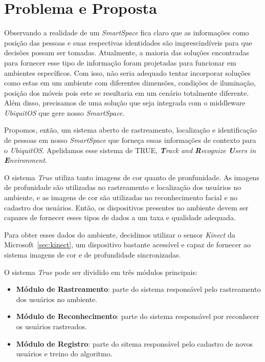 \chapter{Problema e Proposta}

Observando a realidade de um \textit{SmartSpace} fica claro que as informações como posição das pessoas e suas respectivas identidades são imprescindíveis para que decisões possam ser tomadas. Atualmente, a maioria das soluções encontradas para fornecer esse tipo de informação foram projetadas para funcionar em ambientes específicos. Com isso, não seria adequado tentar incorporar soluções como estas em um ambiente com diferentes dimensões, condições de iluminação, posição dos móveis pois este se resultaria em um cenário totalmente diferente. Além disso, precisamos de uma solução que seja integrada com o middleware \textit{UbiquitOS} que gere nosso \textit{SmartSpace}.

Propomos, então, um sistema aberto de rastreamento, localização e identificação de pessoas em nosso \textit{SmartSpace} que forneça essas informações de contexto para o \textit{UbiquitOS}. Apelidamos esse sistema de TRUE, \textit{\textbf{T}rack and \textbf{R}ecognize \textbf{U}sers in \textbf{E}nvironment}.

O sistema \textit{True} utiliza tanto imagens de cor quanto de pronfunidade. As imagens de profunidade são utilizadas no rastreamento e localização dos usuários no ambiente, e as imagens de cor são utilizadas no reconhecimento facial e no cadastro dos usuários. Então, os dispositivos presentes no ambiente devem ser capazes de fornecer esses tipos de dados a um taxa e qualidade adequada. 

Para obter esses dados do ambiente, decidimos utilizar o sensor \textit{Kinect} da Microsoft~\ref{sec:kinect}, um dispositivo bastante acessível e capaz de fornecer ao sistema imagens de cor e de profundidade sincronizadas.

O sistema \textit{True} pode ser dividido em três módulos principais:

	\begin{itemize}
		\item \textbf{Módulo de Rastreamento}: parte do sistema responsável pelo rastreamento dos usuários no ambiente.
		\item \textbf{Módulo de Reconhecimento}: parte do sistema responsável por reconhecer os usuários rastreados.
		\item \textbf{Módulo de Registro}: parte do sitema responsável pelo cadastro de novos usuários e treino do algoritmo.
	\end{itemize}

